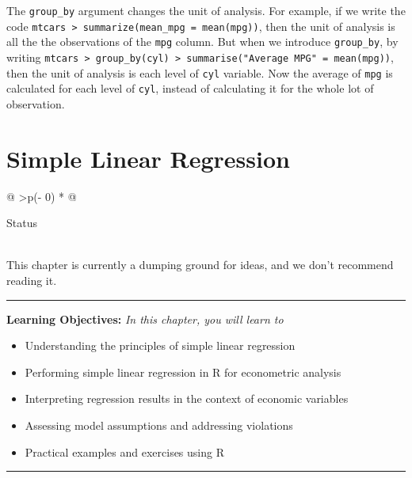 \documentclass[
  letterpaper,
  paper =a4,
  twoside,
  openright,
  headsepline,
  footsepline,
  listof = totocnumbered,
  chapterprefix = true,
  firstiscover,
  parskip = full*]{scrbook}
\providecommand{\abstractname}{Learning Objectives} %
\newenvironment{objectives}[1]{%
	\hrule
	\vspace{5pt}
	\small\textbf{\abstractname: } 
	\newline
	\vspace{0.1cm}
	\small\emph{#1} %
	\itshape %
}{%
	\vspace{5pt}
	\hrule
	\vspace{0.6cm}
}
\begin{document}
The \texttt{group\_by} argument changes the unit of analysis. For
example, if we write the code
\texttt{mtcars\ \textbar{}\textgreater{}\ summarize(mean\_mpg\ =\ mean(mpg))},
then the unit of analysis is all the the observations of the
\texttt{mpg} column. But when we introduce \texttt{group\_by}, by
writing
\texttt{mtcars\ \textbar{}\textgreater{}\ group\_by(cyl)\ \textbar{}\textgreater{}\ summarise("Average\ MPG"\ =\ mean(mpg))},
then the unit of analysis is each level of \texttt{cyl} variable. Now
the average of \texttt{mpg} is calculated for each level of
\texttt{cyl}, instead of calculating it for the whole lot of
observation.


\chapter{Simple Linear Regression}\label{sec-lm}

\begin{longtable}[]{@{}
  >{\centering\arraybackslash}p{(\columnwidth - 0\tabcolsep) * }@{}}
\toprule\noalign{}
\begin{minipage}[b]{\linewidth}\centering
Status
\end{minipage} \\
\midrule\noalign{}
\endhead
\bottomrule\noalign{}
\endlastfoot
This chapter is currently a dumping ground for ideas, and we don't
recommend reading it. \\
\end{longtable}

\begin{objectives}{In this chapter, you will learn to}
\begin{itemize}

\item{Understanding the principles of simple linear regression}

\item{Performing simple linear regression in R for econometric analysis}

\item{Interpreting regression results in the context of economic variables}

\item{Assessing model assumptions and addressing violations}

\item{Practical examples and exercises using R}

\end{itemize}

\end{objectives}
\end{document}
